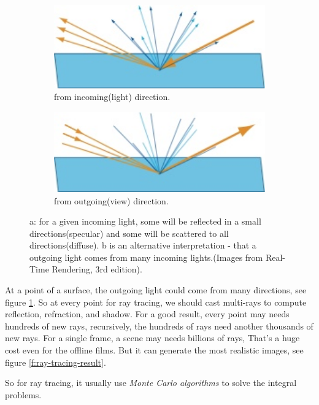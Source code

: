 \begin{figure}
	\begin{subfigure}[b]{0.5\textwidth}
		\includegraphics[width=1.0\textwidth]{graphics/df/explaination-brdf2}
		\caption{from incoming(light) direction.}
	\end{subfigure}
	\begin{subfigure}[b]{0.5\textwidth}
		\includegraphics[width=1.0\textwidth]{graphics/df/explaination-brdf1}
		\caption{from outgoing(view) direction.}
	\end{subfigure}
	\caption{a: for a given incoming light, some will be reflected in a small directions(specular) and some will be scattered to all directions(diffuse). b is an alternative interpretation - that a outgoing light comes from many incoming lights.(Images from Real-Time Rendering, 3rd edition).}
	\label{f:brdf}
\end{figure}

At a point of a surface, the outgoing light could come from many directions, see figure \ref{f:brdf}. So at every point for ray tracing, we should cast multi-rays to compute reflection, refraction, and shadow. For a good result, every point may needs hundreds of new rays, recursively, the hundreds of rays need another thousands of new rays. For a single frame, a scene may needs billions of rays, That's a huge cost even for the offline films. But it can generate the most realistic images, see figure \ref{f:ray-tracing-result}. 

So for ray tracing, it usually use \textit{Monte Carlo algorithms} to solve the integral problems.   

